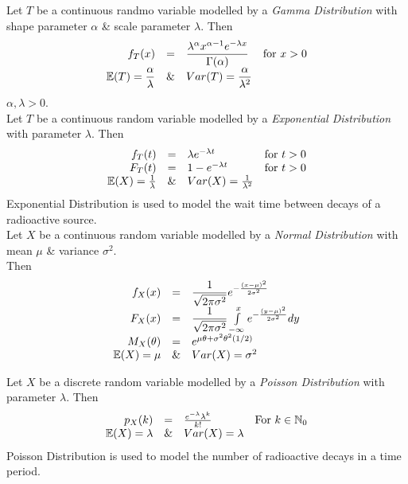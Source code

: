 \documentclass[11pt,a4paper]{article}
\begin{document}
Let $T$ be a continuous randmo variable modelled by a \textit{Gamma Distribution} with shape parameter $\alpha$ \& scale parameter $\lambda$. Then
\[\begin{array}{rcll}
f_T(x)&=&\dfrac{\lambda^\alpha x^{\alpha-1}e^{-\lambda x}}{\Gamma(\alpha)}&\mathrm{for\ }x>0\\
\mathbb{E}(T)=\dfrac{\alpha}{\lambda}&\&&Var(T)=\dfrac{\alpha}{\lambda^2}
\end{array}\]
\nb $\alpha,\lambda>0$.\\

Let $T$ be a continuous random variable modelled by a \textit{Exponential Distribution} with parameter $\lambda$. Then
\[\begin{array}{rcll}
f_T(t)&=&\lambda e^{-\lambda t}&\mathrm{for\ }t>0\\
F_T(t)&=&1-e^{-\lambda t}&\mathrm{for\ }t>0\\
\mathbb{E}(X)=\frac{1}{\lambda}&\&&Var(X)=\frac{1}{\lambda^2}
\end{array}\]
\nb Exponential Distribution is used to model the wait time between decays of a radioactive source.\\

Let $X$ be a continuous random variable modelled by a \textit{Normal Distribution} with mean $\mu$ \& variance $\sigma^2$.\\
Then
\[\begin{array}{rcl}
f_X(x)&=&\dfrac{1}{\sqrt{2\pi\sigma^2}}e^{-\frac{(x-\mu)^2}{2\sigma^2}}\\
F_X(x)&=&\dfrac{1}{\sqrt{2\pi\sigma^2}}\int\limits_{-\infty}^xe^{-\frac{(y-\mu)^2}{2\sigma^2}}dy\\
M_X(\theta)&=&e^{\mu\theta+\sigma^2\theta^2(1/2)}\\
\mathbb{E}(X)=\mu&\&&Var(X)=\sigma^2
\end{array}\]

Let $X$ be a discrete random variable modelled by a \textit{Poisson Distribution} with parameter $\lambda$. Then
\[\begin{array}{rcll}
p_X(k)&=&\frac{e^{-\lambda}\lambda^k}{k!}&\mathrm{For\ }k\in\nats_0\\
\expect(X)=\lambda&\&&Var(X)=\lambda
\end{array}\]
\nb Poisson Distribution is used to model the number of radioactive decays in a time period.\\
\end{document}
